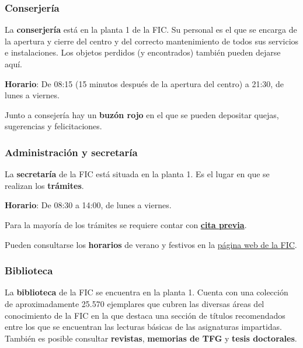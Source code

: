 \subsubsection{Conserjería}

La \textbf{conserjería} está en la planta 1 de la \acrshort{FIC}. Su personal es el que se encarga de la apertura y cierre del centro y del correcto mantenimiento de todos sus servicios e instalaciones. Los objetos perdidos (y encontrados) también pueden dejarse aquí.

\textbf{Horario}: De 08:15 (15 minutos después de la apertura del centro) a 21:30, de lunes a viernes.

\begin{curiosityBox}
    Junto a consejería hay un \textbf{buzón rojo} en el que se pueden depositar quejas, sugerencias y felicitaciones.
\end{curiosityBox}

\subsubsection{Administración y secretaría}

La \textbf{secretaría} de la \acrshort{FIC} está situada en la planta 1. Es el lugar en que se realizan los \textbf{trámites}.

\textbf{Horario}: De 08:30 a 14:00, de lunes a viernes.

\begin{warningBox}
    Para la mayoría de los trámites se requiere contar con  \href{https://outlook.office365.com/book/UNIVERSIDADEDACORUA8@udcgal.onmicrosoft.com/}{\textbf{cita previa}}.
\end{warningBox}

\begin{infoBox}
    Pueden consultarse los \textbf{horarios} de verano y festivos en la \href{https://www.fic.udc.es/gl/horario}{página web de la \acrshort{FIC}}.
\end{infoBox}

\subsubsection{Biblioteca}

La \textbf{biblioteca} de la \acrshort{FIC} se encuentra en la planta 1. Cuenta con una colección de aproximadamente 25.570 ejemplares que cubren las diversas áreas del conocimiento de la \acrshort{FIC} en la que destaca una sección de títulos recomendados entre los que se encuentran las lecturas básicas de las asignaturas impartidas. También es posible consultar \textbf{revistas}, \textbf{memorias de \acrlong{TFG}} y \textbf{tesis doctorales}.

